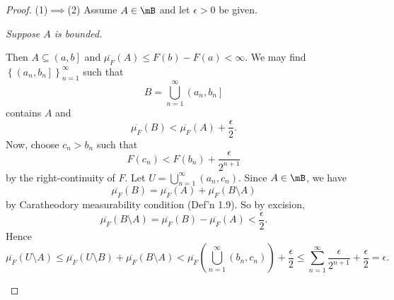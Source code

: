 \documentclass[pmath451]{subfiles}
\begin{document}
    \begin{proof}
        (1)$\implies$(2) Assume $A\in\mB$ and let $\epsilon > 0$ be given.

        \begin{case}
            \textit{Suppose $A$ is bounded.}

            Then $A\subseteq\left( a,b \right]$ and $\overline{\mu_F}\left( A \right)\leq F\left( b \right)-F\left( a \right)<\infty$. We may find $\left\lbrace \left( a_n,b_n \right] \right\rbrace^{\infty}_{n=1}$ such that
            \begin{equation*}
                B = \bigcup^{\infty}_{n=1} \left( a_n,b_n \right]
            \end{equation*}
            contains $A$ and
            \begin{equation*}
                \overline{\mu_F}\left( B \right) < \overline{\mu_F}\left( A \right) + \frac{\epsilon}{2}.
            \end{equation*}
            Now, choose $c_n>b_n$ such that
            \begin{equation*}
                F\left( c_n \right) < F\left( b_n \right) + \frac{\epsilon}{2^{n+1}}
            \end{equation*}
            by the right-continuity of $F$. Let $U = \bigcup^{\infty}_{n=1} \left( a_n,c_n \right)$. Since $A\in\mB$, we have
            \begin{equation*}
                \overline{\mu_F}\left( B \right) = \overline{\mu_F}\left( A \right) + \overline{\mu_F}\left( B\setminus A \right)
            \end{equation*}
            by Caratheodory measurability condition (Def'n 1.9). So by excision,
            \begin{equation*}
                \overline{\mu_F}\left( B\setminus A \right) = \overline{\mu_F}\left( B \right) - \overline{\mu_F}\left( A \right) < \frac{\epsilon}{2}.
            \end{equation*}
            Hence
            \begin{equation*}
                \overline{\mu_F}\left( U\setminus A \right) \leq \overline{\mu_F}\left( U\setminus B \right) + \overline{\mu_F}\left( B\setminus A \right) < \overline{\mu_F}\left( \bigcup^{\infty}_{n=1} \left( b_n,c_n \right) \right) + \frac{\epsilon}{2} \leq \sum^{\infty}_{n=1} \frac{\epsilon}{2^{n+1}} + \frac{\epsilon}{2} = \epsilon.
            \end{equation*}
        \end{case}


\end{proof}
\end{document}
